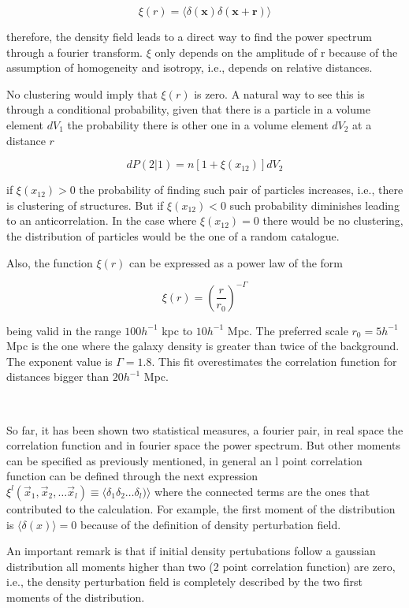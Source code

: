 \[\xi (r) =  \langle  \delta(\textbf{x})\delta(\textbf{x}+\textbf{r}) \rangle\]

therefore, the density field leads to a direct way to find the power spectrum through a fourier 
transform. $\xi$ only depends on the amplitude of r because of the assumption of homogeneity
and isotropy, i.e., depends on relative distances. 

No clustering would imply that $\xi(r)$ is zero. A natural way to see this is through
a conditional probability, given that there is a particle in a volume element $dV_1$
the probability there is other one in a volume element $dV_2$ at a distance $r$

\[dP(2|1) = n[1+\xi(x_{12})]dV_2\]

if $\xi(x_{12})>0$ the probability of finding such pair of particles increases,
i.e., there is clustering of structures. But if $\xi(x_{12})<0$ such probability 
diminishes leading to an anticorrelation.  In the case where $\xi(x_{12})=0$ 
there would be no clustering, the distribution of particles would be the one of 
a random catalogue. 

Also, the function $\xi(r)$ can be expressed as a power law of the form

\[ \xi(r) = \left( \frac{r}{r_0} \right)^{-\Gamma} \]

being valid in the range $100 h^{-1}$ kpc to $10h^{-1}$ Mpc. The preferred
scale $r_0=5h^{-1}$ Mpc is the one where the galaxy density is greater than twice 
of the background. The exponent value is $\Gamma = 1.8$. This fit overestimates
the correlation function for distances bigger than $20 h^{-1}$ Mpc.  


\
 
So far, it has been shown two statistical measures, a fourier pair, in real space the 
correlation function and in fourier space the power spectrum. 
But other moments can be specified as previously mentioned, in general an l point 
correlation function can be defined through the next expression 
$\xi^l(\vec{x}_1,\vec{x}_2,\ldots \vec{x}_l) \equiv  \langle  \delta_1\delta_2 \ldots\delta_l)\rangle $ where the connected terms are the ones that contributed to the calculation.
For example, the first moment of the distribution is $\langle \delta(x) \rangle = 0$ because 
of the definition of density perturbation field. 

An important remark is that if initial density pertubations follow a gaussian distribution 
all moments higher than two (2 point correlation function) are zero, i.e., the density
perturbation field is completely described by the two first moments of the distribution. 

